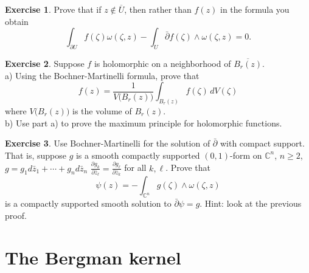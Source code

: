\documentclass[12pt,openany]{book}
\newcommand{\C}{{\mathbb{C}}}
\theoremstyle{plain}
\theoremstyle{remark}
\theoremstyle{definition}
\newenvironment{exbox}{%
    \def\FrameCommand{\vrule width 1pt \relax\hspace {10pt}}%
    \MakeFramed {\advance \hsize -\width \FrameRestore }%
}{%
    \endMakeFramed
}
\theoremstyle{exercise}
\newtheorem{exercise}{Exercise}[section]
\theoremstyle{example}
\begin{document}
\begin{exbox}
\begin{exercise}
Prove that if $z \notin \overline{U}$, then rather than $f(z)$ in the
formula you obtain
\begin{equation*}
\int_{\partial U}
f(\zeta) \omega(\zeta,z)
-
\int_{U}
\bar{\partial} f(\zeta) \wedge \omega(\zeta,z) = 0 .
\end{equation*}
\end{exercise}

\begin{exercise}
Suppose $f$ is holomorphic on a neighborhood of
$\overline{B_r(z)}$.\\
a) Using the Bochner-Martinelli formula, prove that
\begin{equation*}
f(z) = \frac{1}{V\bigl(B_r(z)\bigr)} \int_{B_r(z)} f(\zeta) \, dV(\zeta)
\end{equation*}
where $V\bigl(B_r(z)\bigr)$ is the volume of $B_r(z)$.\\
b) Use part a) to prove the maximum principle for holomorphic functions.
\end{exercise}

\begin{exercise}
Use Bochner-Martinelli for the solution of $\bar{\partial}$ with compact
support.  That is, suppose $g$ is a smooth compactly supported $(0,1)$-form
on $\C^n$, $n \geq 2$, $g = g_1 d\bar{z}_1 + \cdots + g_n d\bar{z}_n$
$\frac{\partial g_k}{\partial \bar{z}_\ell} =
\frac{\partial g_\ell}{\partial \bar{z}_k}$ for all $k, \ell$.
Prove that
\begin{equation*}
\psi(z) = - \int_{\C^n} g(\zeta) \wedge \omega(\zeta,z)
\end{equation*}
is a compactly supported smooth solution to $\bar{\partial} \psi = g$.
Hint: look at the previous proof.
\end{exercise}
\end{exbox}


\section{The Bergman kernel}
\end{document}

